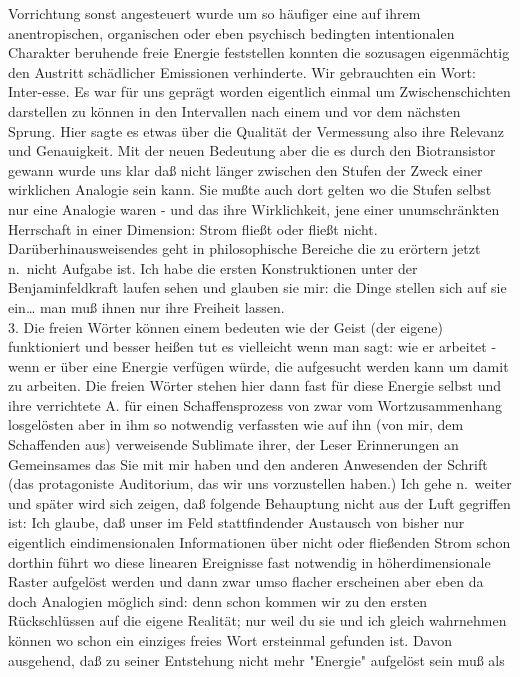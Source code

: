 \documentclass[
]{article}
\begin{document}
Vorrichtung sonst angesteuert wurde um so häufiger eine auf ihrem
anentropischen, organischen oder eben psychisch bedingten intentionalen
Charakter beruhende freie Energie feststellen konnten die sozusagen
eigenmächtig den Austritt schädlicher Emissionen verhinderte. Wir
gebrauchten ein Wort: Inter-esse. Es war für uns geprägt worden
eigentlich einmal um Zwischenschichten darstellen zu können in den
Intervallen nach einem und vor dem nächsten Sprung. Hier sagte es etwas
über die Qualität der Vermessung also ihre Relevanz und Genauigkeit. Mit
der neuen Bedeutung aber die es durch den Biotransistor gewann wurde uns
klar daß nicht länger zwischen den Stufen der Zweck einer wirklichen
Analogie sein kann. Sie mußte auch dort gelten wo die Stufen selbst nur
eine Analogie waren - und das ihre Wirklichkeit, jene einer
unumschränkten Herrschaft in einer Dimension: Strom fließt oder fließt
nicht. Darüberhinausweisendes geht in philosophische Bereiche die zu
erörtern jetzt n.~nicht Aufgabe ist. Ich habe die ersten Konstruktionen
unter der Benjaminfeldkraft laufen sehen und glauben sie mir: die Dinge
stellen sich auf sie ein\ldots{} man muß ihnen nur ihre Freiheit
lassen.\\
3. Die freien Wörter können einem bedeuten wie der Geist (der eigene)
funktioniert und besser heißen tut es vielleicht wenn man sagt: wie er
arbeitet - wenn er über eine Energie verfügen würde, die aufgesucht
werden kann um damit zu arbeiten. Die freien Wörter stehen hier dann
fast für diese Energie selbst und ihre verrichtete A. für einen
Schaffensprozess von zwar vom Wortzusammenhang losgelösten aber in ihm
so notwendig verfassten wie auf ihn (von mir, dem Schaffenden aus)
verweisende Sublimate ihrer, der Leser Erinnerungen an Gemeinsames das
Sie mit mir haben und den anderen Anwesenden der Schrift (das
protagoniste Auditorium, das wir uns vorzustellen haben.) Ich gehe
n.~weiter und später wird sich zeigen, daß folgende Behauptung nicht aus
der Luft gegriffen ist: Ich glaube, daß unser im Feld stattfindender
Austausch von bisher nur eigentlich eindimensionalen Informationen über
nicht oder fließenden Strom schon dorthin führt wo diese linearen
Ereignisse fast notwendig in höherdimensionale Raster aufgelöst werden
und dann zwar umso flacher erscheinen aber eben da doch Analogien
möglich sind: denn schon kommen wir zu den ersten Rückschlüssen auf die
eigene Realität; nur weil du sie und ich gleich wahrnehmen können wo
schon ein einziges freies Wort ersteinmal gefunden ist. Davon ausgehend,
daß zu seiner Entstehung nicht mehr "Energie" aufgelöst sein muß als
\end{document}
